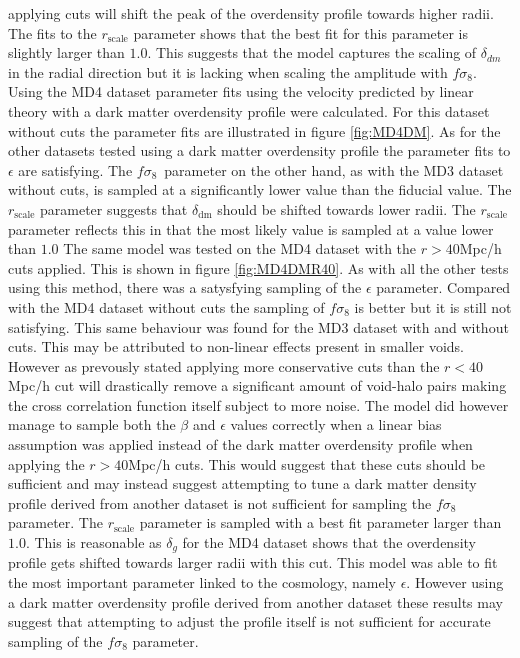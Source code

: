applying cuts will shift the peak of the overdensity profile towards higher radii. The fits to the $r_{\mathrm{scale}}$ parameter shows that the best fit for this parameter is slightly larger than $1.0$. This suggests that the model captures the scaling of $\delta_{dm}$ in the radial direction but it is lacking when scaling the amplitude with $f\sigma_8$.\\\indent
Using the MD4 dataset parameter fits using the velocity predicted by linear theory with a dark matter overdensity profile were calculated. For this dataset without cuts the parameter fits are illustrated in figure \ref{fig:MD4DM}. As for the other datasets tested using a dark matter overdensity profile the parameter fits to $\epsilon$ are satisfying. The $f\sigma_8$ parameter on the other hand, as with the MD3 dataset without cuts, is sampled at a significantly lower value than the fiducial value. The $r_{\mathrm{scale}}$ parameter suggests that $\delta_{\mathrm{dm}}$ should be shifted towards lower radii. The $r_{\mathrm{scale}}$ parameter reflects this in that the most likely value is sampled at a value lower than $1.0$ The same model was tested on the MD4 dataset with the $r>40$Mpc/h cuts applied. This is shown in figure \ref{fig:MD4DMR40}. As with all the other tests using this method, there was a satysfying sampling of the  $\epsilon$ parameter. Compared with the MD4 dataset without cuts the sampling of $f\sigma_8$ is better but it is still not satisfying. This same behaviour was found for the MD3 dataset with and without cuts. This may be attributed to non-linear effects present in smaller voids. However as prevously stated applying more conservative cuts than the $r<40$Mpc/h cut will drastically remove a significant amount of void-halo pairs making the cross correlation function itself subject to more noise. The model did however manage to sample both the $\beta$ and $\epsilon$ values correctly when a linear bias assumption was applied instead of the dark matter overdensity profile when applying the $r>40$Mpc/h cuts. This would suggest that these cuts should be sufficient and may instead suggest attempting to tune a dark matter density profile derived from another dataset is not sufficient for sampling the $f\sigma_8$ parameter. The $r_\mathrm{scale}$ parameter is sampled with a best fit parameter larger than $1.0$. This is reasonable as $\delta_g$ for the MD4 dataset shows that the overdensity profile gets shifted towards larger radii with this cut. This model was able to fit the most important parameter linked to the cosmology, namely $\epsilon$. However using a dark matter overdensity profile derived from another dataset these results may suggest that attempting to adjust the profile itself is not sufficient for accurate sampling of the $f\sigma_8$ parameter.

